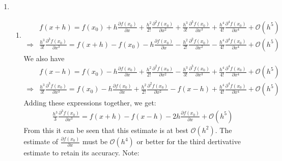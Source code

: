 \documentclass[12pt,a4]{article}
\begin{document}
\begin{enumerate}
  \item
    \begin{enumerate}
      \item
        \begin{align*}
                      & f(x + h) = f(x_0) + h \frac{\partial f(x_0)}{\partial x} + \frac{h^2}{2!} \frac{\partial^2 f(x_0)}{\partial x^2} + \frac{h^3}{3!} \frac{\partial^3 f(x_0)}{\partial x^3} + \frac{h^4}{4!} \frac{\partial^4 f(x_0)}{\partial x^4} + \mathscr{O}(h^5)\\ %
          \Rightarrow & \frac{h^3}{3!} \frac{\partial^3 f(x_0)}{\partial x^3} = f(x + h) - f(x_0) - h \frac{\partial f(x_0)}{\partial x} - \frac{h^2}{2!} \frac{\partial^2 f(x_0)}{\partial x^2} - \frac{h^4}{4!} \frac{\partial^4 f(x_0)}{\partial x^4} + \mathscr{O}(h^5) %
        \end{align*}
        We also have
        \begin{align*}
                      & f(x - h) = f(x_0) - h \frac{\partial f(x_0)}{\partial x} + \frac{h^2}{2!} \frac{\partial^2 f(x_0)}{\partial x^2} - \frac{h^3}{3!} \frac{\partial^3 f(x_0)}{\partial x^3} + \frac{h^4}{4!} \frac{\partial^4 f(x_0)}{\partial x^4} + \mathscr{O}(h^5)\\ %
          \Rightarrow & \frac{h^3}{3!} \frac{\partial^3 f(x_0)}{\partial x^3} = f(x_0) - h \frac{\partial f(x_0)}{\partial x} + \frac{h^2}{2!} \frac{\partial^2 f(x_0)}{\partial x^2} - f(x - h) + \frac{h^4}{4!} \frac{\partial^4 f(x_0)}{\partial x^4} + \mathscr{O}(h^5) %
        \end{align*}
        Adding these expressions together, we get:
        \begin{align}
          & \frac{h^3}{3} \frac{\partial^3 f(x_0)}{\partial x^3} = f(x + h) - f(x - h) - 2 h \frac{\partial f(x_0)}{\partial x} + \mathscr{O}(h^5) \label{eq:thirdDevFirst}%
        \end{align}
        From this it can be seen that this estimate is at best $\mathscr{O}(h^2)$.
        The estimate of $\frac{\partial f(x_0)}{\partial x}$ must be $\mathscr{O}(h^4)$ or better for the third dertivative estimate to retain its accuracy.
        Note:
        \begin{align*}

\end{align*}
\end{enumerate}
\end{enumerate}
\end{document}
